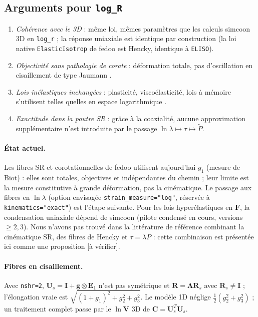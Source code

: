 \documentclass[11pt,a4paper]{article}
\newcommand{\Lam}{\bm{\Lambda}}
\newcommand{\code}[1]{\texttt{#1}}
\newcommand{\averif}{\textcolor{orange!80!black}{[à vérifier]}}
\begin{document}
\subsection{Arguments pour \code{log\_R}}
\begin{enumerate}
\item \emph{Cohérence avec le 3D} : même loi, mêmes paramètres que les calculs
simcoon 3D en \code{log\_r} ; la réponse uniaxiale est identique par construction
(la loi native \code{ElasticIsotrop} de fedoo est Hencky, identique à \code{ELISO}).
\item \emph{Objectivité sans pathologie de corate} : déformation totale,
pas d'oscillation en cisaillement de type Jaumann \cite{dienes1979}.
\item \emph{Lois inélastiques inchangées} : plasticité, viscoélasticité,
lois à mémoire s'utilisent telles quelles en espace logarithmique
\cite{eterovic1990,miehe2002}.
\item \emph{Exactitude dans la poutre SR} : grâce à la coaxialité, aucune
approximation supplémentaire n'est introduite par le passage
$\ln\lambda\mapsto\tau\mapsto\tilde P$.
\end{enumerate}
\paragraph{État actuel.} Les fibres SR et corotationnelles de fedoo utilisent
aujourd'hui $g_1$ (mesure de Biot) : elles sont totales, objectives et
indépendantes du chemin ; leur limite est la mesure constitutive à grande
déformation, pas la cinématique. Le passage aux fibres en $\ln\lambda$
(option envisagée \code{strain\_measure="log"}, réservée à
\code{kinematics="exact"}) est l'étape suivante. Pour les lois hyperélastiques en
$\mathbf F$, la condensation uniaxiale dépend de simcoon (pilote condensé en
cours, versions $\ge2{,}3$). Nous n'avons pas trouvé dans la littérature de
référence combinant la cinématique SR, des fibres de Hencky et
$\tau=\lambda P$ : cette combinaison est présentée ici comme une proposition
\averif.

\paragraph{Fibres en cisaillement.} Avec \code{nshr=2},
$\mathbf U_s=\mathbf I+\mathbf g\otimes\mathbf E_1$ n'est pas symétrique et
$\mathbf R=\Lam\mathbf R_s$ avec $\mathbf R_s\ne\mathbf I$ ; l'élongation vraie
est $\sqrt{(1+g_1)^2+g_2^2+g_3^2}$. Le modèle 1D néglige
$\tfrac12(g_2^2+g_3^2)$ ; un traitement complet passe par le $\ln\mathbf V$ 3D de
$\mathbf C=\mathbf U_s^T\mathbf U_s$.
\end{document}
